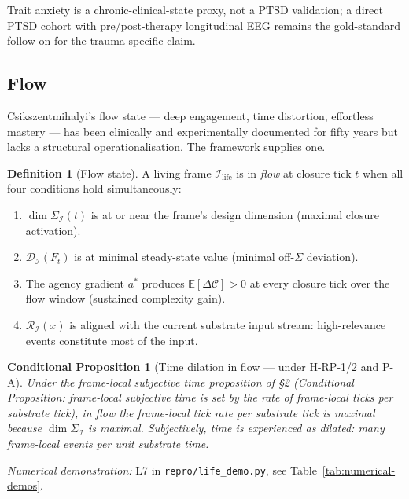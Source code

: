 \documentclass[11pt]{article}
\theoremstyle{plain}
\newtheorem{conditional}[theorem]{Conditional Proposition}
\theoremstyle{definition}
\newtheorem{definition}[theorem]{Definition}
\theoremstyle{remark}
\newcommand{\Ical}{\mathcal{I}}
\newcommand{\Ccal}{\mathcal{C}}
\newcommand{\Rcal}{\mathcal{R}}
\newcommand{\Dcal}{\mathcal{D}}
\newcommand{\Ilife}{\Ical_{\mathrm{life}}}
\begin{document}
Trait anxiety is a chronic-clinical-state proxy, not a PTSD validation; a direct PTSD cohort with pre/post-therapy longitudinal EEG remains the gold-standard follow-on for the trauma-specific claim.

\subsection{Flow}\label{sec:flow}

Csikszentmihalyi's flow state --- deep engagement, time distortion, effortless mastery --- has been clinically and experimentally documented for fifty years but lacks a structural operationalisation. The framework supplies one.

\begin{definition}[Flow state]\label{def:flow}
A living frame $\Ilife$ is in \emph{flow} at closure tick $t$ when all four conditions hold simultaneously:
\begin{enumerate}[leftmargin=2em]
\item $\dim \Sigma_\Ical(t)$ is at or near the frame's design dimension (maximal closure activation).
\item $\Dcal_\Ical(F_t)$ is at minimal steady-state value (minimal off-$\Sigma$ deviation).
\item The agency gradient $a^*$ produces $\mathbb{E}[\Delta \Ccal] > 0$ at every closure tick over the flow window (sustained complexity gain).
\item $\Rcal_\Ical(x)$ is aligned with the current substrate input stream: high-relevance events constitute most of the input.
\end{enumerate}
\end{definition}

\begin{conditional}[Time dilation in flow --- under H-RP-1/2 and P-A]\label{thm:flow-time}
Under the frame-local subjective time proposition of \citet{SmartProcessingToPOV} \S 2 (Conditional Proposition: frame-local subjective time is set by the rate of frame-local ticks per substrate tick), in flow the frame-local tick rate per substrate tick is maximal because $\dim \Sigma_\Ical$ is maximal. Subjectively, time is experienced as dilated: many frame-local events per unit substrate time.
\end{conditional}

\noindent\emph{Numerical demonstration:} L7 in \texttt{repro/life\_demo.py}, see Table~\ref{tab:numerical-demos}.
\end{document}
